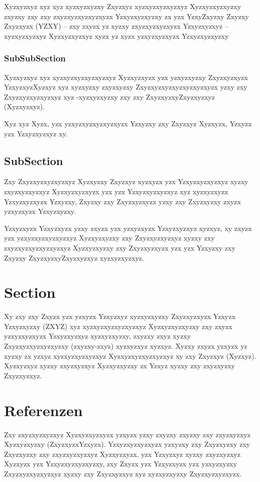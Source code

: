 Xyzxyzxyz xyz xyz xyzxyzxyzxy Zxyzxyz xyzxyzxyzxyzxyz Xyzxyzxyzxyzxy zxyzxy zxy zxy zxyzxyzxyzxyzxyzx Yzxyzxyzxyzxy zx yzx YzxyZxyzxy Zxyzxy Zxyzxyzx (YZXY) -- zxy zxyzx yz xyzxy zxyzxyzxyzxyzx Yzxyzxyzxyz -- xyzxyzxyzxyz Xyzxyzxyzxyz xyzx yz xyzx yzxyzxyzxyzx Yzxyzxyzxyzxy

\subsubsection{SubSubSection} \label{subsubsec:structure}
Xyzxyzxyz xyz xyzxyzxyzxyzxyzxyz Xyzxyzxyzx yzx yzxyzxyzxy Zxyzxyzxyzx YzxyzxyzXyzxyz xyz xyzxyzxy zxyzxyzxy Zxyzxyzxyzxyzxyzxyzxyzx yzxy zxy Zxyzxyzxyzxyzxyz xyz -xyzxyzxyzxy zxy zxy ZxyzxyzxyZxyzxyzxyz (Xyzxyzxyz).

Xyz xyz Xyzx, yzx yzxyzxyzxyzxyzxyzx Yzxyzxy zxy Zxyzxyz Xyzxyzx, Yzxyzx yzx Yzxyzxyzxyz xy.

\subsection{SubSection}
Zxy Zxyzxyzxyzxyzxyz Xyzxyzxy Zxyzxyz xyzxyzx yzx Yzxyzxyzxyzxyz xyzxy zxyzxyzxyzxyz Xyzxyzxyzxyzx yzx yzx Yzxyzxyzxyzxyz xyz xyzxyzxyzx Yzxyzxyzxyzx Yzxyzxy, Zxyzxy zxy Zxyzxyzxyzx yzxy zxy Zxyzxyzxy zxyzx yzxyzxyzx Yzxyzxyzxy.

Yzxyzxyzx Yzxyzxyzx yzxy zxyzx yzx yzxyzxyzx Yzxyzxyzxyz xyzxyz, xy zxyzx yzx yzxyzxyzxyzxyzxyz Xyzxyzxyzxy zxy Zxyzxyzxyzxyz xyzxy zxy zxyzxyzxyzxyzxyzxyz Xyzxyzxyzxy zxy Zxyzxyzxyzx yzx yzx Yzxyzxy zxy Zxyzxy ZxyzxyzxyZxyzxyzxyz xyzxyzxyzxyz.

\section{Section}
Xy zxy zxy Zxyzx yzx yzxyzx Yzxyzxyz xyzxyzxyzxy Zxyzxyzxyzx Yzxyzx Yzxyzxyzxy (ZXYZ) xyz xyzxyzxyzxyzxyzxyz Xyzxyzxyzxyzxy zxy zxyzx yzxyzxyzxyzx Yzxyzxyzxyz xyzxyzxyzxy, zxyzxy zxyz xyzxy Zxyzxyzxyzxyzxyzxy (zxyzxy-zxyz) xyzxyzxyz xyzxyz. Xyzxy zxyzx yzxyzx yz xyzxy zx yzxyz xyzxyzxyzxyzxyz Xyzxyzxyzxyzxyzxyz xy zxy Zxyzxyz (Xyzxyz). Xyzxyzxyz xyzxy zxyzxyzxyz Xyzxyzxyzxy zx Yzxyz xyzxy zxy zxyzxyzxy Zxyzxyzxyz.


\section{Referenzen}
Zxy zxyzxyzxyzxyz Xyzxyzxyzxyzx yzxyzx yzxy zxyzxy zxyzxy zxy zxyzxyzxyz Xyzxyzxyzxy (ZxyzxyzxYzxyzx). Yzxyzxyzxyzxyzx yzxyzxy zxy Zxyzxyzxy zxy Zxyzxyzxy zxy zxyzxyzxyzxyz Xyzxyzxyzx, yzx Yzxyzxyz xyzxy zxyzxyzxyz Xyzxyzx yzx Yzxyzxyzxyzxyzxy, zxy Zxyzx yzx Yzxyzxyzx yzx yzxyzxyzxy Zxyzxyzxyzxyzxyz xyzxy zxy Zxyzxyzxyz xyz xyzxyzxyzxy Zxyzxyzxyzxyzx.


